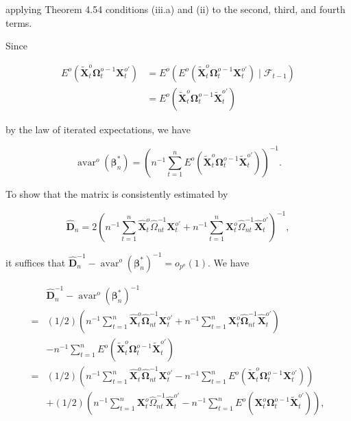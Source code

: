 \documentclass[10pt]{article}
\begin{document}
applying Theorem 4.54 conditions (iii.a) and (ii) to the second, third, and fourth terms.

Since

$$
\begin{aligned}
E^{o}\left(\tilde{\mathbf{X}}_{t}^{o} \boldsymbol{\Omega}_{t}^{o-1} \mathbf{X}_{t}^{o \prime}\right) & =E^{o}\left(E^{o}\left(\tilde{\mathbf{X}}_{t}^{o} \boldsymbol{\Omega}_{t}^{o-1} \mathbf{X}_{t}^{o \prime}\right) \mid \mathcal{F}_{t-1}\right) \\
& =E^{o}\left(\tilde{\mathbf{X}}_{t}^{o} \boldsymbol{\Omega}_{t}^{o-1} \tilde{\mathbf{X}}_{t}^{o \prime}\right)
\end{aligned}
$$

by the law of iterated expectations, we have

$$
\operatorname{avar}^{o}\left(\boldsymbol{\beta}_{n}^{*}\right)=\left(n^{-1} \sum_{t=1}^{n} E^{o}\left(\tilde{\mathbf{X}}_{t}^{o} \boldsymbol{\Omega}_{t}^{o-1} \tilde{\mathbf{X}}_{t}^{o \prime}\right)\right)^{-1} .
$$

To show that the matrix is consistently estimated by

$$
\hat{\mathbf{D}}_{n}=2\left(n^{-1} \sum_{t=1}^{n} \hat{\mathbf{X}}_{t}^{o} \hat{\Omega}_{n t}^{-1} \mathbf{X}_{t}^{o \prime}+n^{-1} \sum_{t=1}^{n} \mathbf{X}_{t}^{o} \hat{\Omega}_{n t}^{-1} \hat{\mathbf{X}}_{t}^{o \prime}\right)^{-1},
$$

it suffices that $\hat{\mathbf{D}}_{n}^{-1}-\operatorname{avar}^{o}\left(\boldsymbol{\beta}_{n}^{*}\right)^{-1}=o_{p^{o}}(1)$. We have

$$
\begin{aligned}
& \hat{\mathbf{D}}_{n}^{-1}-\operatorname{avar}^{o}\left(\boldsymbol{\beta}_{n}^{*}\right)^{-1} \\
= & (1 / 2)\left(n^{-1} \sum_{t=1}^{n} \hat{\mathbf{X}}_{t}^{o} \hat{\mathbf{\Omega}}_{n t}^{-1} \mathbf{X}_{t}^{o \prime}+n^{-1} \sum_{t=1}^{n} \mathbf{X}_{t}^{o} \hat{\mathbf{\Omega}}_{n t}^{-1} \hat{\mathbf{X}}_{t}^{o \prime}\right) \\
& -n^{-1} \sum_{t=1}^{n} E^{o}\left(\tilde{\mathbf{X}}_{t}^{o} \boldsymbol{\Omega}_{t}^{o-1} \tilde{\mathbf{X}}_{t}^{o \prime}\right) \\
= & (1 / 2)\left(n^{-1} \sum_{t=1}^{n} \hat{\mathbf{X}}_{t}^{o} \hat{\mathbf{\Omega}}_{n t}^{-1} \mathbf{X}_{t}^{o \prime}-n^{-1} \sum_{t=1}^{n} E^{o}\left(\tilde{\mathbf{X}}_{t}^{o} \boldsymbol{\Omega}_{t}^{o-1} \mathbf{X}_{t}^{o \prime}\right)\right) \\
& +(1 / 2)\left(n^{-1} \sum_{t=1}^{n} \mathbf{X}_{t}^{o} \hat{\Omega}_{n t}^{-1} \hat{\mathbf{X}}_{t}^{o \prime}-n^{-1} \sum_{t=1}^{n} E^{o}\left(\mathbf{X}_{t}^{o} \boldsymbol{\Omega}_{t}^{o-1} \tilde{\mathbf{X}}_{t}^{o \prime}\right)\right),
\end{aligned}
$$
\end{document}
